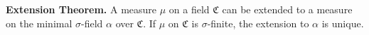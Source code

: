 \textbf{Extension Theorem.} A measure $\mu$ on a field $\mathfrak{C}$ can be extended to a measure on the minimal $\sigma$-field $\alpha$ over $\mathfrak{C}$. If $\mu$ on $\mathfrak{C}$ is $\sigma$-finite, the extension to $\alpha$ is unique.

